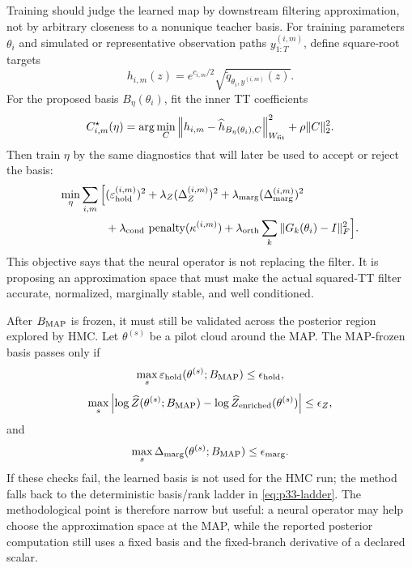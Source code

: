 \documentclass[11pt]{article}
\numberwithin{equation}{section}
\begin{document}
Training should judge the learned map by downstream filtering approximation,
not by arbitrary closeness to a nonunique teacher basis.  For training
parameters \(\theta_i\) and simulated or representative observation paths
\(y^{(i,m)}_{1:T}\), define square-root targets
\begin{equation}
    h_{i,m}(z)
    =
    e^{c_{i,m}/2}
    \sqrt{\widetilde q_{\theta_i,y^{(i,m)}}(z)}.
    \label{eq:p33-neural-training-target}
\end{equation}
For the proposed basis \(B_\eta(\theta_i)\), fit the inner TT coefficients
\begin{equation}
    C_{i,m}^\star(\eta)
    =
    \arg\min_C
    \left\|
    h_{i,m}-\widehat h_{B_\eta(\theta_i),C}
    \right\|_{W_{\rm fit}}^2
    +
    \rho\|C\|_2^2.
    \label{eq:p33-neural-inner-fit}
\end{equation}
Then train \(\eta\) by the same diagnostics that will later be used to accept
or reject the basis:
\begin{equation}
\begin{aligned}
    \min_\eta
    \sum_{i,m}\Big[
    &(\varepsilon_{\rm hold}^{(i,m)})^2
    +\lambda_Z(\Delta_Z^{(i,m)})^2
    +\lambda_{\rm marg}(\Delta_{\rm marg}^{(i,m)})^2\\
    &+\lambda_{\rm cond}\,
      \operatorname{penalty}(\kappa^{(i,m)})
    +\lambda_{\rm orth}
      \sum_k\|G_k(\theta_i)-I\|_F^2
    \Big].
\end{aligned}
    \label{eq:p33-neural-training-objective}
\end{equation}
This objective says that the neural operator is not replacing the filter.  It
is proposing an approximation space that must make the actual squared-TT
filter accurate, normalized, marginally stable, and well conditioned.

After \(B_{\rm MAP}\) is frozen, it must still be validated across the
posterior region explored by HMC.  Let
\(\theta^{(s)}\) be a pilot cloud around the MAP.  The MAP-frozen basis passes
only if
\begin{equation}
    \max_s
    \varepsilon_{\rm hold}(\theta^{(s)};B_{\rm MAP})
    \le \epsilon_{\rm hold},
    \label{eq:p33-map-cloud-holdout}
\end{equation}
\begin{equation}
    \max_s
    \left|
    \log\widehat Z(\theta^{(s)};B_{\rm MAP})
    -
    \log\widehat Z_{\rm enriched}(\theta^{(s)})
    \right|
    \le \epsilon_Z,
    \label{eq:p33-map-cloud-evidence}
\end{equation}
and
\begin{equation}
    \max_s
    \Delta_{\rm marg}(\theta^{(s)};B_{\rm MAP})
    \le \epsilon_{\rm marg}.
    \label{eq:p33-map-cloud-marginal}
\end{equation}
If these checks fail, the learned basis is not used for the HMC run; the
method falls back to the deterministic basis/rank ladder in
\eqref{eq:p33-ladder}.  The methodological point is therefore narrow but
useful: a neural operator may help choose the approximation space at the MAP,
while the reported posterior computation still uses a fixed basis and the
fixed-branch derivative of a declared scalar.
\end{document}
